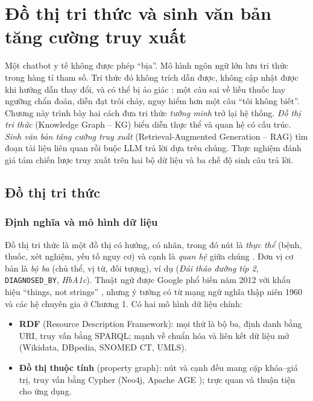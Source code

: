 \chapter{Đồ thị tri thức và sinh văn bản tăng cường truy xuất}
\label{chap:kgrag}

Một chatbot y tế không được phép ``bịa''. Mô hình ngôn ngữ lớn lưu tri thức trong hàng tỉ tham số. Tri thức đó không trích dẫn được, không cập nhật được khi hướng dẫn thay đổi, và có thể bị ảo giác \cite{ji2023halluc}: một câu sai về liều thuốc hay ngưỡng chẩn đoán, diễn đạt trôi chảy, nguy hiểm hơn một câu ``tôi không biết''. Chương này trình bày hai cách đưa tri thức \emph{tường minh} trở lại hệ thống. \emph{Đồ thị tri thức} (Knowledge Graph – KG) biểu diễn thực thể và quan hệ có cấu trúc. \emph{Sinh văn bản tăng cường truy xuất} (Retrieval-Augmented Generation – RAG) tìm đoạn tài liệu liên quan rồi buộc LLM trả lời dựa trên chúng. Thực nghiệm đánh giá tám chiến lược truy xuất trên hai bộ dữ liệu và ba chế độ sinh câu trả lời.

\section{Đồ thị tri thức}

\subsection{Định nghĩa và mô hình dữ liệu}

Đồ thị tri thức là một đồ thị có hướng, có nhãn, trong đó nút là \emph{thực thể} (bệnh, thuốc, xét nghiệm, yếu tố nguy cơ) và cạnh là \emph{quan hệ} giữa chúng \cite{hogan2021}. Đơn vị cơ bản là \emph{bộ ba} (chủ thể, vị từ, đối tượng), ví dụ (\emph{Đái tháo đường típ 2}, \texttt{DIAGNOSED\_BY}, \emph{HbA1c}). Thuật ngữ được Google phổ biến năm 2012 với khẩu hiệu ``things, not strings'' \cite{singhal2012}, nhưng ý tưởng có từ mạng ngữ nghĩa thập niên 1960 và các hệ chuyên gia ở Chương 1. Có hai mô hình dữ liệu chính:
\begin{itemize}
  \item \textbf{RDF} (Resource Description Framework): mọi thứ là bộ ba, định danh bằng URI, truy vấn bằng SPARQL; mạnh về chuẩn hóa và liên kết dữ liệu mở (Wikidata, DBpedia, SNOMED CT, UMLS).
  \item \textbf{Đồ thị thuộc tính} (property graph): nút và cạnh đều mang cặp khóa–giá trị, truy vấn bằng Cypher (Neo4j, Apache AGE \cite{apacheage}); trực quan và thuận tiện cho ứng dụng.
\end{itemize}

